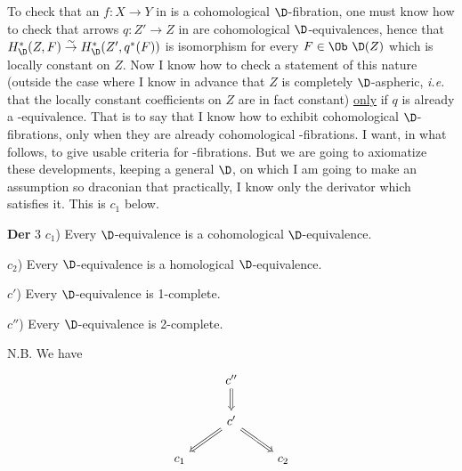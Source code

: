 To check that an $f : X \to Y$ in \Dia{} is a cohomological $\D$-fibration, one must
know how to check that arrows $q : Z' \to Z$ in \Dia{} are cohomological $\D$-equivalences, hence that $H^*_{\D}(Z,F) \overset{\sim}{\rightarrow} H^*_{\D}(Z',q^*(F))$ is isomorphism for every $F \in \Ob\ \D(Z)$ which is locally constant on $Z$. Now I know how to check a statement of this nature (outside the case where I know in advance that $Z$ is completely $\D$-aspheric, \textit{i.e.} that the locally constant coefficients on $Z$ are in fact constant) \underline{only} if $q$ is already a \Hot-equivalence. %
That is to say that I know how to exhibit cohomological $\D$-fibrations, only when they are already cohomological \HOT-fibrations. I want, in what follows, to give usable criteria for \HOT-fibrations. But we are going to axiomatize these developments, keeping a general $\D$, on which I am going to make an assumption so draconian that practically, I know only the derivator \HOT{} which satisfies it. This is $c_1$ below.

\textbf{Der} 3 $c_1$) Every $\D$-equivalence is a cohomological $\D$-equivalence.

$c_2$) Every $\D$-equivalence is a homological $\D$-equivalence.

$c'$) Every $\D$-equivalence is 1-complete.

$c''$) Every $\D$-equivalence is 2-complete.

N.B. We have
\[
\begin{tikzcd}
& c'' \arrow[d, Rightarrow] & \\
& c' \arrow[dl, Rightarrow] \arrow[dr, Rightarrow] & \\
c_1 & & c_2
\end{tikzcd}
\]